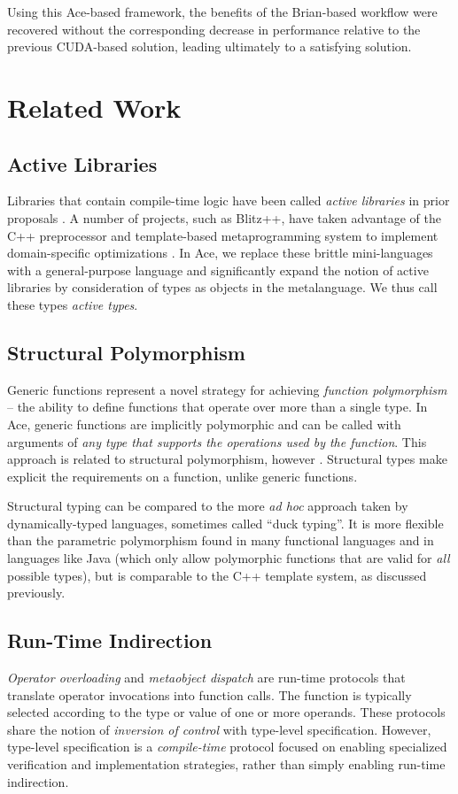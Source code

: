 \documentclass[9pt,preprint]{sigplanconf}
\begin{document}
Using this Ace-based framework, the benefits of the Brian-based workflow were recovered without the  corresponding decrease in performance relative to the previous CUDA-based solution, leading ultimately to a satisfying solution.

\section{Related Work}\label{related}
\subsection{Active Libraries}
Libraries that contain compile-time logic have been called {\it active libraries} in prior proposals \cite{activelibraries}. A number of  projects, such as Blitz++, have taken advantage of the C++ preprocessor and template-based metaprogramming system to implement domain-specific optimizations \cite{veldhuizen2000blitz++}. In Ace, we replace these brittle mini-languages with a general-purpose language and significantly expand the notion of active libraries by consideration of types as objects in the metalanguage. We thus call these types \emph{active types}.


\subsection{Structural Polymorphism}
Generic functions represent a novel strategy for achieving {\it function polymorphism} -- the ability to define functions that operate over more than a single type. In Ace, generic functions are implicitly polymorphic and can be called with arguments of {\it any type that supports the operations used by the function}. This approach is related to structural polymorphism, however \cite{malayeri2009structural}. Structural types make explicit the requirements on a function, unlike generic functions.

Structural typing can be compared to the more \emph{ad hoc} approach taken by dynamically-typed languages, sometimes called ``duck typing''. It is more flexible than the parametric polymorphism found in many functional languages and in languages like Java (which only allow polymorphic functions that are valid for {\it all} possible types), but is comparable to the C++ template system, as discussed previously.

\subsection{Run-Time Indirection}
{\it Operator overloading} \cite{vanWijngaarden:Mailloux:Peck:Koster:Sintzoff:Lindsey:Meertens:Fisker:acta:1975} and {\it metaobject dispatch} \cite{Kiczales91} are run-time protocols that translate operator invocations into function calls. The function is typically selected according to the type or value of one or more operands. These protocols share the notion of {\it inversion of control} with type-level specification. However, type-level specification is a {\it compile-time} protocol focused on enabling specialized verification and implementation strategies, rather than simply enabling run-time indirection.
\end{document}
